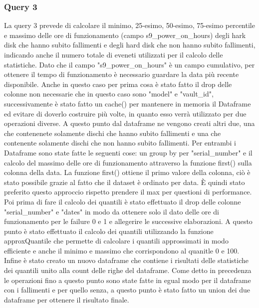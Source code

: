 \documentclass[conference]{IEEEtran}
\begin{document}
\subsubsection{Query 3}
La query 3 prevede di calcolare il minimo, 25-esimo, 50-esimo, 75-esimo percentile e massimo delle ore di funzionamento (campo s9\_power\_on\_hours) degli hark disk che hanno subito fallimenti e degli hard disk che non hanno subito fallimenti, indicando anche il numero totale di eveneti utilizzati per il calcolo delle statistiche.
Dato che il campo "s9\_power\_on\_hours" è un campo cumulativo, per ottenere il tempo di funzionamento è necessario guardare la data più recente disponibile.
Anche in questo caso per prima cosa è stato fatto il drop delle colonne non necessarie che in questo caso sono "model" e "vault\_id", successivamente è stato fatto un cache() per mantenere in memoria il Dataframe ed evitare di doverlo costruire più volte, in quanto esso verrà utilizzato per due operazioni diverse. A questo punto dal dataframe ne vengono creati altri due, una che contenenete solamente dischi che hanno subito fallimenti e una che contenente solamente dischi che non hanno subito fallimenti. Per entrambi i Dataframe sono state fatte le seguenti cose: un group by per "serial\_number" e il calcolo del massimo delle ore di funzionamento attraverso la funzione first() sulla colonna della data. La funzione first() ottiene il primo valore della colonna, ciò è stato possibile grazie al fatto che il dataset è ordinato per data. È quindi stato preferito questo approccio rispetto prendere il max per questioni di performance. Poi prima di fare il calcolo dei quantili è stato effettuato il drop delle colonne "serial\_number" e "dates" in modo da ottenere solo il dato delle ore di funzionamento per le failure 0 e 1 e allegerire le successive elaborazioni. A questo punto è stato effettuato il calcolo dei quantili utilizzando la funzione approxQuantile che permette di calcolare i quantili approssimati in modo efficiente e anche il minimo e massimo che corrispondono al quanitle 0 e 100. Infine è stato creato un nuovo dataframe che contiene i risultati delle statistiche dei quantili unito alla count delle righe del dataframe. Come detto in precedenza le operazioni fino a questo punto sono state fatte in egual modo per il dataframe con i fallimenti e per quello senza, a questo punto è stato fatto un union dei due dataframe per ottenere il risultato finale.  
\end{document}
